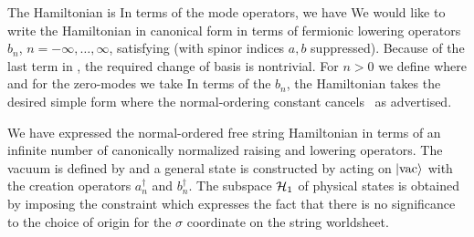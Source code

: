 The Hamiltonian is
\eqn{}
In terms of the mode operators,
we have
\eqn{}
We would like to write the Hamiltonian in canonical form in
terms of fermionic lowering
operators $b_n$, $n=-\infty,\ldots,\infty$, satisfying
\eqn{}
(with spinor indices $a,b$ suppressed).
Because of
the last term in \sdfkj, the required change of basis is nontrivial.
For $n>0$ we define
\eqn{}
where 
\eqn{}
and for the zero-modes we take
\eqn{}
In terms of the $b_n$, the Hamiltonian takes the desired simple form
\eqn{}
where the normal-ordering constant
\eqn{}
cancels \bnormal\ as advertised.



We have expressed the normal-ordered free string Hamiltonian
\eqn{}
in terms of an infinite number of canonically normalized raising
and lowering operators.
The vacuum is defined by
\eqn{}
and a general state is constructed by acting on $|{\rm vac}\rangle$
with the creation operators $a_n^\dagger$ and $b_n^\dagger$.
The subspace ${\cal{H}}_1$ of physical states
is obtained by imposing the constraint
\eqn{}
which expresses the fact that there is no significance to the
choice of origin for the $\sigma$ coordinate on the string
worldsheet.

